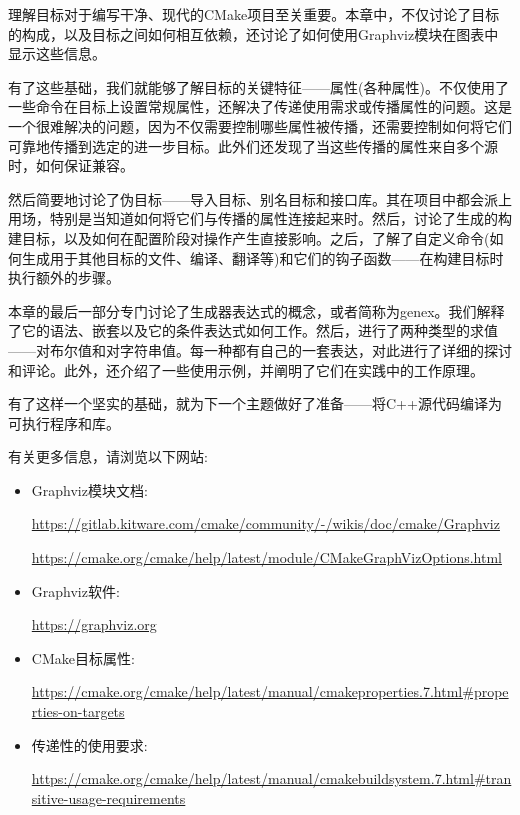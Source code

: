 
理解目标对于编写干净、现代的CMake项目至关重要。本章中，不仅讨论了目标的构成，以及目标之间如何相互依赖，还讨论了如何使用Graphviz模块在图表中显示这些信息。

有了这些基础，我们就能够了解目标的关键特征——属性(各种属性)。不仅使用了一些命令在目标上设置常规属性，还解决了传递使用需求或传播属性的问题。这是一个很难解决的问题，因为不仅需要控制哪些属性被传播，还需要控制如何将它们可靠地传播到选定的进一步目标。此外们还发现了当这些传播的属性来自多个源时，如何保证兼容。

然后简要地讨论了伪目标——导入目标、别名目标和接口库。其在项目中都会派上用场，特别是当知道如何将它们与传播的属性连接起来时。然后，讨论了生成的构建目标，以及如何在配置阶段对操作产生直接影响。之后，了解了自定义命令(如何生成用于其他目标的文件、编译、翻译等)和它们的钩子函数——在构建目标时执行额外的步骤。

本章的最后一部分专门讨论了生成器表达式的概念，或者简称为genex。我们解释了它的语法、嵌套以及它的条件表达式如何工作。然后，进行了两种类型的求值——对布尔值和对字符串值。每一种都有自己的一套表达，对此进行了详细的探讨和评论。此外，还介绍了一些使用示例，并阐明了它们在实践中的工作原理。

有了这样一个坚实的基础，就为下一个主题做好了准备——将C++源代码编译为可执行程序和库。


有关更多信息，请浏览以下网站:

\begin{itemize}
\item 
Graphviz模块文档:

\url{https://gitlab.kitware.com/cmake/community/-/wikis/doc/cmake/Graphviz}

\url{https://cmake.org/cmake/help/latest/module/CMakeGraphVizOptions.html}
	
\item 
Graphviz软件:

\url{https://graphviz.org}
	
\item 
CMake目标属性:

\url{https://cmake.org/cmake/help/latest/manual/cmakeproperties.7.html\#properties-on-targets}

\item 
传递性的使用要求:
 
\url{https://cmake.org/cmake/help/latest/manual/cmakebuildsystem.7.html\#transitive-usage-requirements}
\end{itemize}










